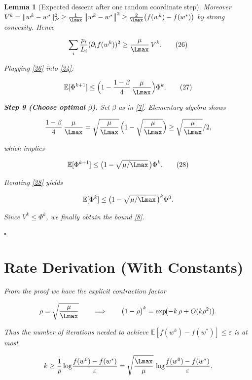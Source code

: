 \documentclass{article}
\newtheorem{lemma}{Lemma}
\newcommand{\E}{\mathbb{E}}
\newcommand{\norm}[1]{\left\| #1\right\|}
\begin{document}
\begin{lemma}[Expected descent after one random coordinate step]
Moreover $V^{k}= \|w^{k}-w^{*}\|_{P}^{2}\ge
\frac{1}{\Lmax}\norm{w^{k}-w^{*}}^{2}
\ge\frac{2}{\Lmax}\bigl(f(w^{k})-f(w^{*})\bigr)$
by strong convexity.  Hence

\[
\sum_{i}\frac{p_{i}}{L_{i}}(\partial_{i}f(w^{k}))^{2}
\ge \frac{\mu}{\Lmax}\,V^{k}.                                 \tag{26}
\]

Plugging \eqref{26} into \eqref{24}:

\[
\E[\Phi^{k+1}]
\le \Bigl(1-\frac{1-\beta}{4}\,\frac{\mu}{\Lmax}\Bigr)\Phi^{k}. \tag{27}
\]

\medskip
\noindent\textbf{Step 9 (Choose optimal $\beta$).}
Set $\beta$ as in \eqref{7}.  Elementary algebra shows

\[
\frac{1-\beta}{4}\,\frac{\mu}{\Lmax}
= \sqrt{\frac{\mu}{\Lmax}}\,\Bigl(1-\sqrt{\frac{\mu}{\Lmax}}\Bigr)
\ge \sqrt{\frac{\mu}{\Lmax}}/2,
\]

which implies

\[
\E[\Phi^{k+1}]
\le \bigl(1-\sqrt{\mu/\Lmax}\,\bigr)\Phi^{k}.                \tag{28}
\]

Iterating \eqref{28} yields

\[
\E[\Phi^{k}]
\le \bigl(1-\sqrt{\mu/\Lmax}\,\bigr)^{k}\Phi^{0}.
\]

Since $V^{k}\le \Phi^{k}$, we finally obtain the bound \eqref{8}.

\hfill $\square$

\section*{Rate Derivation (With Constants)}
From the proof we have the explicit contraction factor

\[
\rho = \sqrt{\frac{\mu}{\Lmax}}
\qquad\Longrightarrow\qquad
\bigl(1-\rho\bigr)^{k}
= \exp\!\bigl(-k\,\rho+O(k\rho^{2})\bigr).
\]

Thus the number of iterations needed to achieve
$\E[f(w^{k})-f(w^{*})]\le\varepsilon$ is at most

\[
k\ge \frac{1}{\rho}\log\!\frac{f(w^{0})-f(w^{*})}{\varepsilon}
   = \sqrt{\frac{\Lmax}{\mu}}\,
     \log\!\frac{f(w^{0})-f(w^{*})}{\varepsilon}.
\]


\end{lemma}
\end{document}

